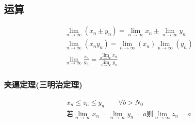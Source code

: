 \subsection{运算}
\begin{align}
&\lim\limits_{n\to\infty}{(x_n\pm y_n)} = \lim\limits_{n\to\infty}x_n\pm\lim\limits_{n\to\infty}y_n \\
&\lim\limits_{n\to\infty}{(x_n y_n)} = \lim\limits _{n\to\infty}(x_n)\lim\limits_{n\to\infty}(y_n) \\
&\lim\limits_{n\to\infty}{\frac{x_n}{y_n}} = \frac{\lim\limits_{n\to\infty}{x_n}}{\lim\limits_{n\to\infty}{y_n}}
\end{align}
\subsubsection{夹逼定理(三明治定理)}
\begin{equation}\label{eq:squeeze_theorem}
\begin{split}
&x_n\leqslant z_n\leqslant y_n \qquad \forall b>N_0 \\
&\mbox{若}\lim\limits_{n\to{\infty}}x_n = \lim\limits_{n\to\infty}y_n = a \mbox{则}\lim\limits_{n\to\infty}z_n = a
\end{split}
\end{equation}
